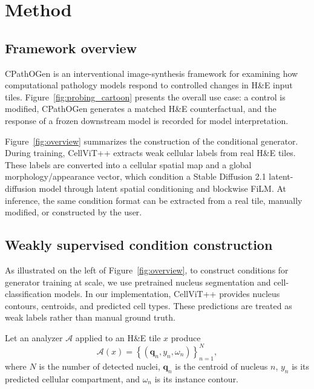 \section{Method}
\label{sec:method}

\subsection{Framework overview}
\label{sec:framework-overview}

CPathOGen is an interventional image-synthesis framework for examining how computational pathology models respond to controlled changes in H\&E input tiles. Figure~\ref{fig:probing_cartoon} presents the overall use case: a control is modified, CPathOGen generates a matched H\&E counterfactual, and the response of a frozen downstream model is recorded for model interpretation.

Figure~\ref{fig:overview} summarizes the construction of the conditional generator. During training, CellViT++ extracts weak cellular labels from real H\&E tiles. These labels are converted into a cellular spatial map and a global morphology/appearance vector, which condition a Stable Diffusion 2.1 latent-diffusion model through latent spatial conditioning and blockwise FiLM. At inference, the same condition format can be extracted from a real tile, manually modified, or constructed by the user.

\subsection{Weakly supervised condition construction}
\label{sec:weak-conditions}

As illustrated on the left of Figure~\ref{fig:overview}, to construct conditions for generator training at scale, we use pretrained nucleus segmentation and cell-classification models. In our implementation, CellViT++ provides nucleus contours, centroids, and predicted cell types. These predictions are treated as weak labels rather than manual ground truth.

Let an analyzer $\mathcal{A}$ applied to an H\&E tile $x$ produce
\begin{equation}
\mathcal{A}(x)
=
\left\{
    (\mathbf{q}_n,y_n,\omega_n)
\right\}_{n=1}^{N},
\label{eq:nucleus-set}
\end{equation}
where $N$ is the number of detected nuclei, $\mathbf{q}_n$ is the centroid of nucleus $n$, $y_n$ is its predicted cellular compartment, and $\omega_n$ is its instance contour.

